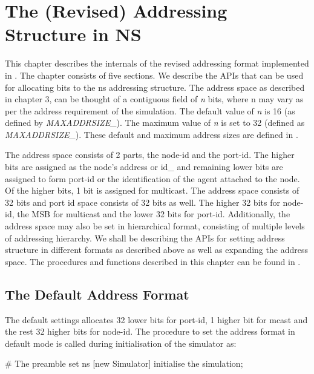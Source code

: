 \chapter{The (Revised) Addressing Structure in NS}
\label{chap:Address}

This chapter describes the internals of the revised addressing format
implemented in \ns. The chapter consists of five sections. We
describe the APIs that can be used for allocating bits to the ns addressing
structure. The address space as described in chapter 3, can be thought
of a contiguous field of {\em n} bits, where n may vary as per the
address requirement of the simulation. The default value of {\em n} is
16 (as defined by {\em MAXADDRSIZE\_}). The maximum value of {\em n} is
set to 32 (defined as {\em MAXADDRSIZE\_}). These default and maximum 
address sizes are defined in .

The address space consists of 2 parts, the node-id and the port-id.
The higher bits are assigned as the node's
address or id\_ and remaining lower bits are assigned to form port-id or
the identification of the agent attached to the node. Of the higher
bits, 1 bit is assigned for multicast. The address space consists of 32 bits and port id space consists of 32 bits as well.
The higher 32 bits for node-id, the MSB for multicast and the lower 32
bits for port-id. Additionally, the address space may
also be set in hierarchical format, consisting of multiple levels of
addressing hierarchy. 
We shall be describing the APIs for setting address structure in
different formats as described above as well as expanding the address
space. 
The procedures and functions described in this chapter can be found in
.

\section{The Default Address Format}
\label{sec:defaultFormat}

The default settings allocates 32 lower bits for port-id, 1 higher bit
for mcast and the rest 32 higher bits for node-id. The procedure to set
the address format in default mode is called during initialisation of
the simulator as:


\begin{program}
{\cf # The preamble}
set ns [new Simulator]                  \; initialise the simulation;
\end{program}

